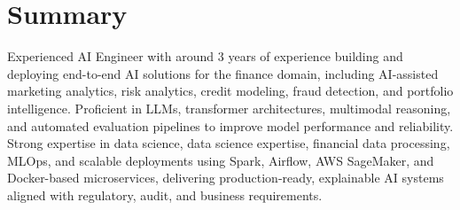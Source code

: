 \documentclass[letterpaper,11pt]{article}
\begin{document}

\vspace{4pt}
\section{Summary}
\vspace{-4pt}
\small{Experienced AI Engineer with around 3 years of experience building and deploying end-to-end AI solutions for the finance domain, including AI-assisted marketing analytics, risk analytics, credit modeling, fraud detection, and portfolio intelligence. Proficient in LLMs, transformer architectures, multimodal reasoning, and automated evaluation pipelines to improve model performance and reliability. Strong expertise in data science, data science expertise, financial data processing, MLOps, and scalable deployments using Spark, Airflow, AWS SageMaker, and Docker-based microservices, delivering production-ready, explainable AI systems aligned with regulatory, audit, and business requirements.}
\vspace{2pt}
\end{document}
